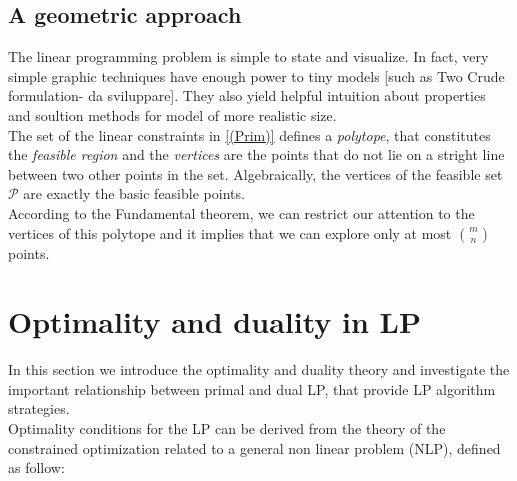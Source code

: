 \documentclass[a4paper,10 pt,titlepage,twoside]{book}
\theoremstyle{plain}
\theoremstyle{definition}
\newtheorem{ex}[thm]{Example}
\theoremstyle{remark}
\begin{document}
\subsection*{A geometric approach}
The linear programming problem is simple to state and visualize. In fact, very simple graphic techniques have enough power to tiny models [such as Two Crude formulation- da sviluppare]. They also yield helpful intuition about properties and soultion methods for model of more realistic size.\\ The set of the linear constraints in \ref{(Prim)} defines a \textit{polytope}, that constitutes the \textit{feasible region} and the \textit{vertices} are the points that do not lie on a stright line between two other points in the set. Algebraically, the vertices of the feasible set $\mathcal{P}$ are exactly the basic feasible points.\\ According to the Fundamental theorem, we can restrict our attention to the vertices of this polytope and it implies that we can explore only at most  ${m}\choose{n}$ points. 

\section{Optimality and duality in LP}
In this section we introduce the optimality and duality theory and investigate the important relationship between primal and dual LP, that provide LP algorithm strategies.\\ 
Optimality conditions for the LP can be derived from the theory of the constrained optimization related to a general non linear problem (NLP), defined as follow:
\end{document}

